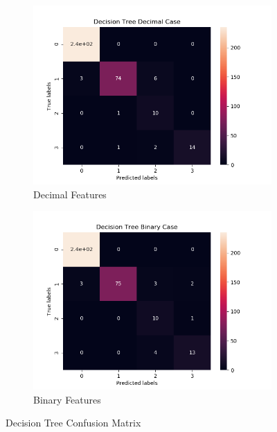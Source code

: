 \begin{figure}[H]
     \centering
     
     \begin{subfigure}[b]{0.48\textwidth}
         \centering
         \includegraphics[width=\textwidth]{../Figures/Decision Tree Decimal Case_conf_mat.png}
         \caption{Decimal Features}
     \end{subfigure}
     \hfill
     \begin{subfigure}[b]{0.48\textwidth}
         \centering
         \includegraphics[width=\textwidth]{../Figures/Decision Tree Binary Case_conf_mat.png}
         \caption{Binary Features}
     \end{subfigure}
     \caption{Decision Tree Confusion Matrix}
\end{figure}

